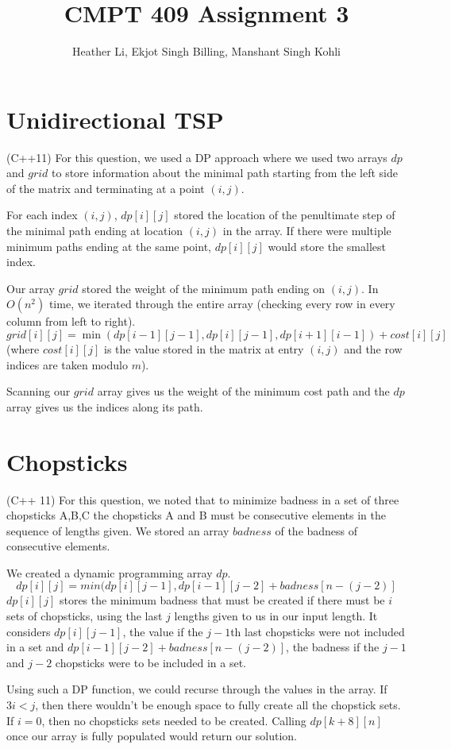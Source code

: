 \documentclass{article}
\title{CMPT 409 Assignment 3}
\author{Heather Li, Ekjot Singh Billing, Manshant Singh Kohli}
\begin{document}
\maketitle

\section{Unidirectional TSP}
(C++11) 
For this question, we used a DP approach where we used two arrays $dp$ and $grid$ to store information about the minimal path starting from the left side of the matrix and terminating at a point $(i,j)$. 
\par
For each index $(i,j)$, $dp[i][j]$ stored the location of the penultimate step of the minimal path ending at location $(i,j)$ in the array. If there were multiple minimum paths ending at the same point, $dp[i][j]$ would store the smallest index.
\par 
Our array $grid$ stored the weight of the minimum path ending on $(i,j)$. In $O(n^2)$ time, we iterated through the entire array (checking every row in every column from left to right).
\[grid[i][j]=\min(dp[i-1][j-1],dp[i][j-1],dp[i+1][i-1])+cost[i][j]\]
(where $cost[i][j]$ is the value stored in the matrix at entry $(i,j)$ and the row indices are taken modulo $m$).
\par 
Scanning our $grid$ array gives us the weight of the minimum cost path and the $dp$ array gives us the indices along its path.





\section{Chopsticks}
(C++ 11) For this question, we noted that to minimize badness in a set of three chopsticks A,B,C the chopsticks A and B must be consecutive elements in the sequence of lengths given. We stored an array $badness$ of the badness of consecutive elements.
\par
We created a dynamic programming array $dp$.
\[dp[i][j]=min(dp[i][j-1],dp[i-1][j-2]+badness[n-(j-2)] \]
$dp[i][j]$ stores the minimum badness that must be created if there must be $i$ sets of chopsticks, using the last $j$ lengths given to us in our input length. It considers $dp[i][j-1]$, the value if the $j-1$th last chopsticks were not included in a set and $dp[i-1][j-2]+badness[n-(j-2)]$, the badness if the $j-1$ and $j-2$ chopsticks were to be included in a set.
\par
Using such a DP function, we could recurse through the values in the array. If $3i<j$, then there wouldn't be enough space to fully create all the chopstick sets. If $i=0$, then no chopsticks sets needed to be created. Calling $dp[k+8][n]$ once our array is fully populated would return our solution.
\end{document}
